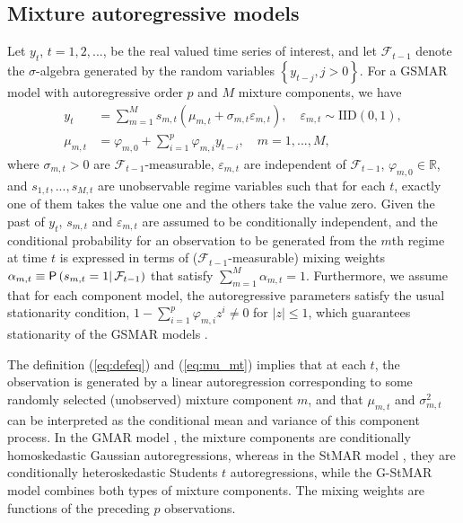 \documentclass[nojss]{jss} %
\begin{document}
\subsection{Mixture autoregressive models}\label{sec:mar}

Let $y_t$, $t=1,2,...$, be the real valued time series of interest, and let $\mathcal{F}_{t-1}$ denote the $\sigma$-algebra generated by the random variables $\left\lbrace y_{t-j},j>0\right\rbrace$. For a GSMAR model with autoregressive order $p$ and $M$ mixture components, we have
%
\begin{align}
y_t &= \sum_{m=1}^{M}s_{m,t}(\mu_{m,t}+\sigma_{m,t}\varepsilon_{m,t}), \quad \varepsilon_{m,t}\sim\text{IID}(0,1), \label{eq:defeq}\\
\mu_{m,t} &= \varphi_{m,0}+\sum_{i=1}^{p}\varphi_{m,i}y_{t-i}, \quad m=1,...,M, \label{eq:mu_mt}
\end{align}
%
where $\sigma_{m,t}>0$ are $\mathcal{F}_{t-1}$-measurable, $\varepsilon_{m,t}$ are independent of $\mathcal{F}_{t-1}$, $\varphi_{m,0}\in\mathbb{R}$, and $s_{1,t},...,s_{M,t}$ are unobservable regime variables such that for each $t$, exactly one of them takes the value one and the others take the value zero. Given the past of $y_t$, $s_{m,t}$ and $\varepsilon_{m,t}$ are assumed to be conditionally independent, and the conditional probability for an observation to be generated from the $m$th regime at time $t$ is expressed in terms of ($\mathcal{F}_{t-1}$-measurable) mixing weights $\alpha_{m,t}\equiv \mathsf{P}\left(s_{m,t}=1\right|\mathcal{F}_{t-1})$ that satisfy $\sum_{m=1}^{M}\alpha_{m,t}=1$. Furthermore, we assume that for each component model, the autoregressive parameters satisfy the usual stationarity condition, $1-\sum_{i=1}^p\varphi_{m,i}z^i\neq0$ for $|z|\leq 1$, which guarantees stationarity of the GSMAR models \citep[Theorem 1]{Virolainen:2020}.

The definition (\ref{eq:defeq}) and (\ref{eq:mu_mt}) implies that at each $t$, the observation is generated by a linear autoregression corresponding to some randomly selected (unobserved) mixture component $m$, and that $\mu_{m,t}$ and $\sigma_{m,t}^2$ can be interpreted as the conditional mean and variance of this component process. In the GMAR model \citep{Kalliovirta+Meitz+Saikkonen:2015}, the mixture components are conditionally homoskedastic Gaussian autoregressions, whereas in the StMAR model \citep{Meitz+Preve+Saikkonen:2021}, they are conditionally heteroskedastic Students $t$ autoregressions, while the G-StMAR model \citep{Virolainen:2020} combines both types of mixture components. The mixing weights are functions of the preceding $p$ observations.
\end{document}
